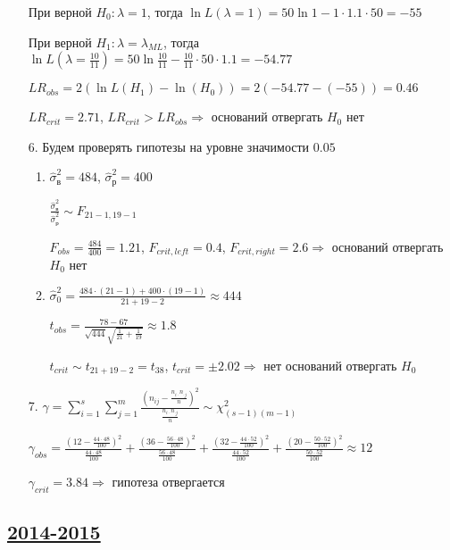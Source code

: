 \begin{enumerate}
При верной $H_0:  \lambda=1$, тогда $\ln L (\lambda=1) = 50 \ln 1 - 1 \cdot 1.1 \cdot 50 = -55$

При верной $H_1: \lambda=\lambda_{ML}$, тогда $\ln L \left(\lambda=\frac{10}{11}\right) = 50 \ln \frac{10}{11} - \frac{10}{11} \cdot 50 \cdot 1.1 = -54.77$

$LR_{obs} = 2(\ln L (H_1) - \ln(H_0)) = 2(-54.77- (-55)) = 0.46$

$LR_{crit} = 2.71$, $LR_{crit} > LR_{obs} \Rightarrow$ оснований отвергать $H_0$ нет

\item[6.]  Будем проверять гипотезы на уровне значимости $0.05$
\begin{enumerate}
\item $\hat{\sigma}^2_{\text{в}} = 484$, $\hat{\sigma}^2_{\text{р}} = 400$

$\frac{\hat{\sigma}^2_{\text{в}} }{\hat{\sigma}^2_{\text{р}}} \sim F_{21-1 , 19-1}$

$F_{obs} = \frac{484}{400} = 1.21$, $F_{crit, left} = 0.4$, $F_{crit, right} = 2.6  \Rightarrow$ оснований отвергать $H_0$ нет

\item $\hat{\sigma}_0^2 = \frac{484 \cdot (21-1) + 400 \cdot (19-1)}{21 + 19 - 2} \approx 444$

$t_{obs} = \frac{78-67}{\sqrt{444} \sqrt{\frac{1}{21}+ \frac{1}{19}}} \approx 1.8 $

$t_{crit}  \sim t_{21+19-2} = t_{38}$, $t_{crit} = \pm 2.02 \Rightarrow$ нет оснований отвергать $H_0$
\end{enumerate}
\item[7.] $\gamma = \sum_{i=1}^s \sum_{j=1}^m \frac{\left(n_{ij} - \frac{n_{i\cdot}n_{\cdot j}}{n}\right)^2}{\frac{n_{i\cdot}n_{\cdot j}}{n}} \sim \chi^2_{(s-1)(m-1)}$

$\gamma_{obs} = \frac{\left(12-\frac{44\cdot48}{100}\right)^2}{\frac{44\cdot48}{100}} + \frac{\left(36-\frac{56\cdot48}{100}\right)^2}{\frac{56\cdot48}{100}} + \frac{\left(32-\frac{44\cdot52}{100}\right)^2}{\frac{44\cdot52}{100}} + \frac{\left(20-\frac{50\cdot52}{100}\right)^2}{\frac{50\cdot52}{100}} \approx 12$

$\gamma_{crit} = 3.84 \Rightarrow$  гипотеза отвергается

\end{enumerate}



\subsection[2014-2015]{\hyperref[sec:kr_04_2014_2015]{2014-2015}}
\label{sec:sol_kr_04_2014_2015}



